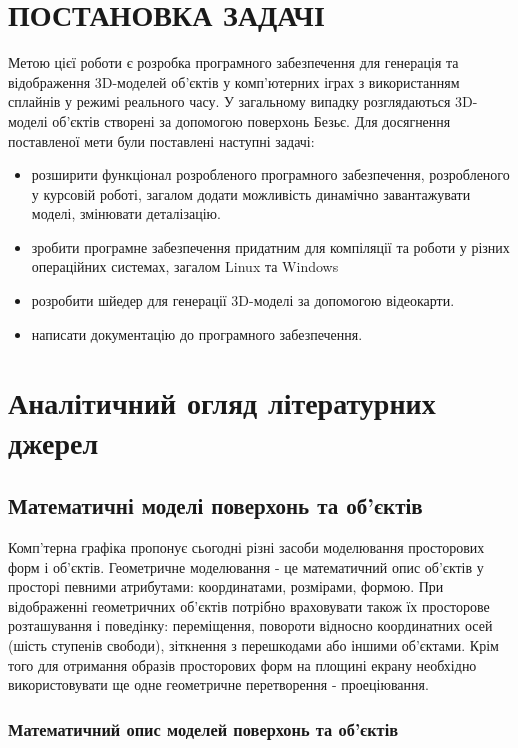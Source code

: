\let\mypdfximage\pdfximage\def\pdfximage{\immediate\mypdfximage}\documentclass[14pt,a4paper]{extarticle}
\theoremstyle{definition}
\renewcommand{\[}{\begin{singlespace}\begin{equation*}}
\renewcommand{\]}{\end{equation*}\end{singlespace}}
\renewcommand{\+}{\discretionary{\mbox{\scriptsize$\hookleftarrow$}}{}{}}
\begin{document}
\section*{ПОСТАНОВКА ЗАДАЧІ}

Метою цієї роботи є розробка програмного забезпечення для генерація та відображення 3D-моделей об'єктів у комп'ютерних іграх з використанням сплайнів у режимі реального часу. У загальному випадку розглядаються 3D-моделі об'єктів створені за допомогою поверхонь Безьє. Для досягнення поставленої мети були поставлені наступні задачі:

\begin{itemize}
\item розширити функціонал розробленого програмного забезпечення, розробленого у курсовій роботі, загалом додати можливість динамічно завантажувати моделі, змінювати деталізацію.
\item зробити програмне забезпечення придатним для компіляції та роботи у різних операційних системах, загалом Linux та Windows
\item розробити шйедер для генерації 3D-моделі за допомогою відеокарти.
\item написати документацію до програмного забезпечення.
\end{itemize}

\section{Аналітичний огляд літературних джерел}

\subsection{Математичні моделі поверхонь та об'єктів}

Комп'терна графіка пропонує сьогодні різні засоби моделювання просторових форм і об'єктів. Геометричне моделювання - це математичний опис об'єктів у просторі певними атрибутами: координатами, розмірами, формою. При відображенні геометричних об'єктів потрібно враховувати також їх просторове розташування і поведінку: переміщення, повороти відносно координатних осей (шість ступенів свободи), зіткнення з перешкодами або іншими об'єктами. Крім того для отримання образів просторових форм на площині екрану необхідно використовувати ще одне геометричне перетворення - проеціювання. 

\subsubsection{Математичний опис моделей поверхонь та об’єктів}
\end{document}
